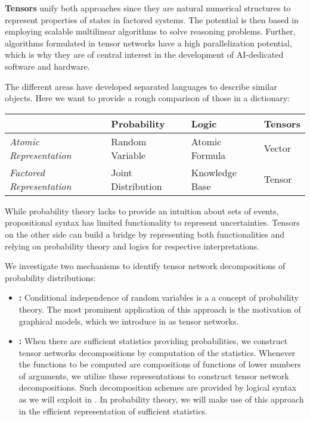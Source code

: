 \textbf{Tensors} unify both approaches since they are natural numerical structures to represent properties of states in factored systems.
The potential is then based in employing scalable multilinear algorithms to solve reasoning problems.
Further, algorithms formulated in tensor networks have a high parallelization potential, which is why they are of central interest in the development of AI-dedicated software and hardware.

The different areas have developed separated languages to describe similar objects.
Here we want to provide a rough comparison of those in a dictionary:

\begin{tabular}{|p{\fourcolumnwidth}|p{\fourcolumnwidth}|p{\fourcolumnwidth}|p{\fourcolumnwidth}|} %
    \hline
    & \textbf{Probability} & \textbf{Logic} & \textbf{Tensors}   \\
    \hline
    \textit{Atomic Representation}        & Random Variable             & Atomic Formula               & Vector             \\
    \textit{Factored Representation}      & Joint Distribution          & Knowledge Base               & Tensor             \\
    \hline
\end{tabular}

While probability theory lacks to provide an intuition about sets of events, propositional syntax has limited functionality to represent uncertainties.
Tensors on the other side can build a bridge by representing both functionalities and relying on probability theory and logics for respective interpretations.


We investigate two mechanisms to identify tensor network decompositions of probability distributions:
\begin{itemize}
    \item \textbf{\IndependenceMechanism{}:} Conditional independence of random variables is a a concept of probability theory.
       The most prominent application of this approach is the motivation of graphical models, which we introduce in  as tensor networks.
    \item \textbf{\ComputationMechanism{}:} When there are sufficient statistics providing probabilities, we construct tensor networks decompositions by computation of the statistics.
        Whenever the functions to be computed are compositions of functions of lower numbers of arguments, we utilize these representations to construct tensor network decompositions.
        Such decomposition schemes are provided by logical syntax as we will exploit in .
        In probability theory, we will make use of this approach in the efficient representation of sufficient statistics.
\end{itemize}
